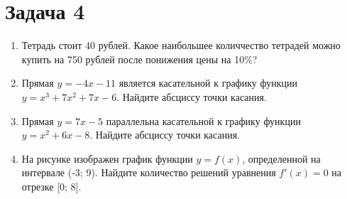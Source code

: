 \chapter{Задача 4}	
	\begin{enumerate}
		
	\item Тетрадь стоит 40 рублей. Какое наибольшее количчество тетрадей можно купить на 750 рублей после понижения цены на 10\%?
	
	\item Прямая $ y = -4x - 11 $ является касательной к графику функции $ y = x^3 + 7x^2 + 7x - 6 $. Найдите абсциссу точки касания.
			
	\item Прямая $ y = 7x - 5 $ параллельна касательной к графику функции $ y = x^2 + 6x - 8$. Найдите абсциссу точки касания.
	
	\item На рисунке изображен график функции $ y = f(x) $, определенной на интервале (-3; 9). Найдите количество решений уравнения $ f'(x) = 0 $ на отрезке [0; 8].
	
\end{enumerate}
